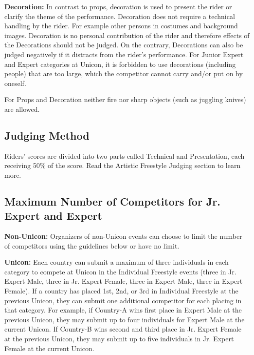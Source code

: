 \textbf{Decoration:} In contrast to props, decoration is used to present the rider or clarify the theme of the performance.
Decoration does not require a technical handling by the rider.
For example other persons in costumes and background images.
Decoration is no personal contribution of the rider and therefore effects of the Decorations should not be judged.
On the contrary, Decorations can also be judged negatively if it distracts from the rider's performance.
For Junior Expert and Expert categories at Unicon, it is forbidden to use decorations (including people) that are too large, which the competitor cannot carry and/or put on by oneself.

For Props and Decoration neither fire nor sharp objects (such as juggling knives) are allowed.

\subsection{Judging Method}
Riders' scores are divided into two parts called Technical and Presentation, each receiving 50\% of the score.
Read the Artistic Freestyle Judging section to learn more.

\subsection{Maximum Number of Competitors for Jr. Expert and Expert}
\textbf{Non-Unicon:} Organizers of non-Unicon events can choose to limit the number of competitors using the guidelines below or have no limit.

\textbf{Unicon:} Each country can submit a maximum of three individuals in each category to compete at Unicon in the Individual Freestyle events (three in Jr. Expert Male, three in Jr. Expert Female, three in Expert Male, three in Expert Female).
If a country has placed 1st, 2nd, or 3rd in Individual Freestyle at the previous Unicon, they can submit one additional competitor for each placing in that category.
For example, if Country-A wins first place in Expert Male at the previous Unicon, they may submit up to four individuals for Expert Male at the current Unicon.
If Country-B wins second and third place in Jr. Expert Female at the previous Unicon, they may submit up to five individuals in Jr. Expert Female at the current Unicon.

